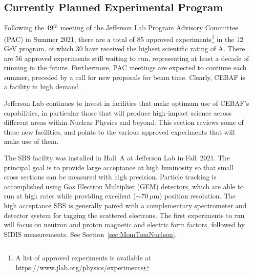 


\subsection{Currently Planned Experimental Program}

Following the 49$^{th}$ meeting of the Jefferson Lab Program Advisory Committee (PAC) in Summer 2021, there are a total of 85 approved experiments\footnote{A list of approved experiments is available at {\sf https://www.jlab.org/physics/experiments}} in the 12 GeV program, of which 30 have received the highest scientific rating of A.  There are 56 approved experiments still waiting to run, representing at least a decade of running in the future.
Furthermore, PAC meetings are expected to continue each summer, preceded by a call for new proposals for beam time. Clearly, CEBAF is a facility in high demand.

Jefferson Lab continues to invest in facilities that make optimum use of CEBAF's capabilities, in particular those that will produce high-impact science across different areas within Nuclear Physics and beyond. This section reviews some of these new facilities, and points to the various approved experiments that will make use of them.

The SBS 
facility was installed in Hall~A at Jefferson Lab in Fall~2021. The principal goal is to provide large acceptance at high luminosity so that small cross sections can be measured with high precision. Particle tracking is accomplished using Gas Electron Multiplier (GEM) detectors, which are able to run at high rates while providing excellent ($\sim70~\mu$m) position resolution. The high acceptance SBS is generally paired with a complementary spectrometer and detector system for tagging the scattered electrons. The first experiments to run will focus on neutron and proton magnetic and electric form factors, followed by SIDIS measurements. See Section~\ref{sec:MomTomNucleon}.

